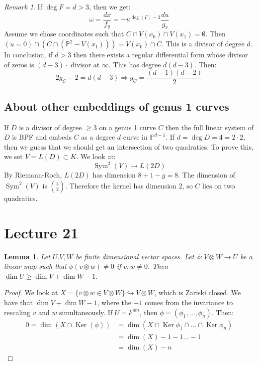 \documentclass{article}
\newcommand{\Proj}{\mathbb{P}}
\DeclareMathOperator{\Ker}{Ker}
\DeclareMathOperator{\Sym}{Sym}
\theoremstyle{plain}
\newtheorem*{lem*}{Lemma}
\theoremstyle{definition}
\theoremstyle{remark}
\newtheorem*{rem}{Remark}
\begin{document}
\begin{rem}
If $\deg F = d>3$, then we get:
\[      \omega = \frac{dx}{f_y} = - u^{\deg(F) - 3} \frac{du}{g_v}    \]
Assume we chose coordinates such that $C \cap V(x_0) \cap V(x_1) = \emptyset$. Then $(u=0) \cap (C\cap (\Proj^2 - V(x_1))) = V(x_0) \cap C$. This is a divisor of degree $d$. In conclusion, if $d>3$ then there exists a regular differential form whose divisor of zeros is $(d-3) \cdot$ divisor at $\infty$. This has degree $d(d-3)$. Then:
\[      2g_C - 2 = d(d-3) \Rightarrow g_C = \frac{(d-1)(d-2)}{2}    \]
\end{rem}

\subsection*{About other embeddings of genus 1 curves}
If $D$ is a divisor of degree $\geq 3$ on a genus 1 curve $C$ then the full linear system of $D$ is BPF and embeds $C$ as a degree $d$ curve in $\Proj^{d-1}$. If $d = \deg D = 4 = 2\cdot 2$, then we guess that we should get an intersection of two quadratics. To prove this, we set $V = L(D) \subset K$. We look at:
\[        \Sym^2(V) \to L(2D)     \]
By Riemann-Roch, $L(2D)$ has dimension $8+1 - g = 8$. The dimension of $\Sym^2(V)$ is $\binom{5}{2}$. Therefore the kernel has dimension $2$, so $C$ lies on two quadratics.


\section*{Lecture 21}
\begin{lem*}
Let $U.V,W$ be finite dimensional vector spaces. Let $\phi: V\otimes W \to U$ be a linear map such that $\phi(v\otimes w) \neq 0$ if $v,w\neq 0$. Then $\dim U \geq \dim V + \dim W - 1$.
\end{lem*}
\begin{proof}
We look at $X = \{ v \otimes w \in V\otimes W \} \hookrightarrow V \otimes W$, which is Zariski closed. We have that $\dim V + \dim W - 1$, where the $-1$ comes from the invariance to rescaling $v$ and $w$ simultaneously. If $U = k^{\oplus n}$, then $\phi = (\phi_1, \dots, \phi_n)$. Then:
\begin{align*}        
0 = \dim(X \cap \Ker(\phi)) &= \dim( X\cap \Ker \phi_1 \cap \dots \cap \Ker \phi_n)  \\
&= \dim(X) - 1 - 1 \dots -1 \\
&= \dim(X) - n
\end{align*}
\end{proof}
\end{document}
